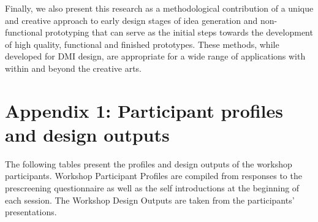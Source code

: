 \documentclass[letterpaper, 12pt]{article}
\begin{document}

Finally, we also present this research as a methodological contribution of a unique and creative approach to early design stages of idea generation and non-functional prototyping that can serve as the initial steps towards the development of high quality, functional and finished prototypes. These methods, while developed for DMI design, are appropriate for a wide range of applications with within and beyond the creative arts. 







\section*{Appendix 1: Participant profiles and design outputs}

\noindent The following tables present the profiles and design outputs of the workshop participants. Workshop Participant Profiles are compiled from responses to the prescreening questionnaire as well as the self introductions at the beginning of each session. The Workshop Design Outputs are taken from the participants' presentations.
\end{document}
